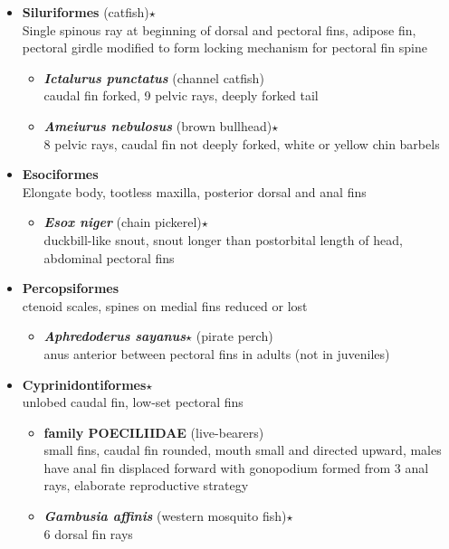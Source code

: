 \documentclass[a4paper,12pt]{article}
\begin{document}
\begin{description}
\begin{itemize}
\begin{itemize}
\begin{itemize}
      \item{\textbf{Siluriformes} (catfish)$\star$} \\ Single spinous ray at beginning of dorsal and pectoral fins, adipose fin, pectoral girdle modified to form locking mechanism for pectoral fin spine
      \begin{itemize}
        \item{\textbf{\textit{   Ictalurus punctatus}} (channel catfish)} \\ caudal fin forked, 9 pelvic rays, deeply forked tail
        \item{\textbf{\textit{   Ameiurus nebulosus}} (brown bullhead)$\star$} \\ 8 pelvic rays, caudal fin not deeply forked, white or yellow chin barbels
      \end{itemize}
      \item{\textbf{Esociformes}} \\ Elongate body, tootless maxilla, posterior dorsal and anal fins
      \begin{itemize}
        \item{\textbf{\textit{   Esox niger}} (chain pickerel)$\star$} \\ duckbill-like snout, snout longer than postorbital length of head, abdominal pectoral fins
      \end{itemize}
      \item{\textbf{Percopsiformes}} \\ ctenoid scales, spines on medial fins reduced or lost
      \begin{itemize}
        \item{\textbf{\textit{   Aphredoderus sayanus}$\star$} (pirate perch)} \\ anus anterior between pectoral fins in adults (not in juveniles)
      \end{itemize} 
      \item{\textbf{Cyprinidontiformes}$\star$} \\ unlobed caudal fin, low-set pectoral fins
      \begin{itemize}
        \item{\textbf{family POECILIIDAE} (live-bearers)} \\ small fins, caudal fin rounded, mouth small and directed upward, males have anal fin displaced forward with gonopodium formed from 3 anal rays, elaborate reproductive strategy
        \item{\textbf{\textit{   Gambusia affinis}} (western mosquito fish)$\star$} \\ 6 dorsal fin rays

\end{itemize}
\end{itemize}
\end{itemize}
\end{itemize}
\end{description}
\end{document}
